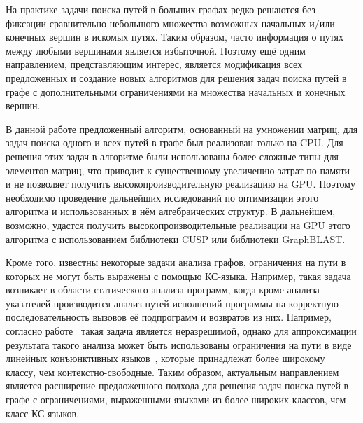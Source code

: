 На практике задачи поиска путей в больших графах редко решаются без фиксации сравнительно небольшого множества возможных начальных и/или конечных вершин в искомых путях. Таким образом, часто информация о путях между любыми вершинами является избыточной. Поэтому ещё одним направлением, представляющим интерес, является модификация всех предложенных и создание новых алгоритмов для решения задач поиска путей в графе с дополнительными ограничениями на множества начальных и конечных вершин.

В данной работе предложенный алгоритм, основанный на умножении матриц, для задач поиска одного и всех путей в графе был реализован только на CPU. Для решения этих задач в алгоритме были использованы более сложные типы для элементов матриц, что приводит к существенному увеличению затрат по памяти и не позволяет получить высокопроизводительную реализацию на GPU. Поэтому необходимо проведение дальнейших исследований по оптимизации этого алгоритма и использованных в нём алгебраических структур. В дальнейшем, возможно, удастся получить высокопроизводительные реализации на GPU этого алгоритма с использованием библиотеки CUSP или библиотеки GraphBLAST.

Кроме того, известны некоторые задачи анализа графов, ограничения на пути в которых не могут быть выражены с помощью КС-языка. Например, такая задача возникает в области статического анализа программ, когда кроме анализа указателей производится анализ путей исполнений программы на корректную последовательность вызовов её подпрограмм и возвратов из них. Например, согласно работе~\cite{linearconjunctive} такая задача является неразрешимой, однако для аппроксимации результата такого анализа может быть использованы ограничения на пути в виде линейных конъюнктивных языков~\cite{okhotin2001conjunctive}, которые принадлежат более широкому классу, чем контекстно-свободные. Таким образом, актуальным направлением является расширение предложенного подхода для решения задач поиска путей в графе с ограничениями, выраженными языками из более широких классов, чем класс КС-языков.




